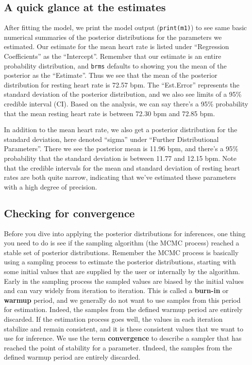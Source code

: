 \documentclass[
]{book}
\begin{document}
\subsection{A quick glance at the estimates}\label{a-quick-glance-at-the-estimates}

After fitting the model, we print the model output (\texttt{print(m1)}) to see same basic numerical summaries of the posterior distributions for the parameters we estimated. Our estimate for the mean heart rate is listed under ``Regression Coefficients'' as the ``Intercept''. Remember that our estimate is an entire probability distribution, and \texttt{brms} defaults to showing you the mean of the posterior as the ``Estimate''. Thus we see that the mean of the posterior distribution for resting heart rate is 72.57 bpm. The ``Est.Error'' represents the standard deviation of the posterior distribution, and we also see limits of a 95\% credible interval (CI). Based on the analysis, we can say there's a 95\% probability that the mean resting heart rate is between 72.30 bpm and 72.85 bpm.

In addition to the mean heart rate, we also get a posterior distribution for the standard deviation, here denoted ``sigma'' under ``Further Distributional Parameters''. There we see the posterior mean is 11.96 bpm, and there's a 95\% probability that the standard deviation is between 11.77 and 12.15 bpm. Note that the credible intervals for the mean and standard deviation of resting heart rates are both quite narrow, indicating that we've estimated these parameters with a high degree of precision.

\subsection{Checking for convergence}\label{checking-for-convergence}

Before you dive into applying the posterior distributions for inferences, one thing you need to do is see if the sampling algorithm (the MCMC process) reached a stable set of posterior distributions. Remember the MCMC process is basically using a sampling process to estimate the posterior distributions, starting with some initial values that are supplied by the user or internally by the algorithm. Early in the sampling process the sampled values are biased by the initial values and can vary widely from iteration to iteration. This is called a \textbf{burn-in} or \textbf{warmup} period, and we generally do not want to use samples from this period for estimation. Indeed, the samples from the defined warmup period are entirely discarded. If the estimation process goes well, the values in each iteration stabilize and remain consistent, and it is these consistent values that we want to use for inference. We use the term \textbf{convergence} to describe a sampler that has reached the point of stability for a parameter. tIndeed, the samples from the defined warmup period are entirely discarded.
\end{document}
